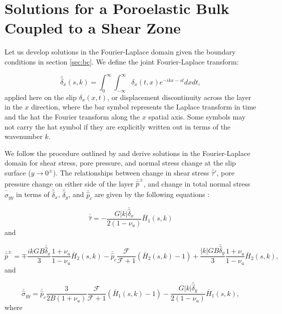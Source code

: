 \documentclass[draft]{agujournal2019}
\begin{document}
\section{Solutions for a Poroelastic Bulk Coupled to a Shear Zone} \label{sec:porosol}


Let us develop solutions in the Fourier-Laplace domain given the boundary conditions in section \ref{sec:bc}. We define the joint Fourier-Laplace transform: 

\begin{equation}
\bar{\hat{\delta}}_x(s,k) = \int_{0}^{\infty} \int_{-\infty}^{\infty} \delta_x(t,x)
e^{-ikx-st} dx dt ,
\label{eq:LF}
\end{equation}
applied here on the slip $\delta_x(x,t)$, or displacement discontinuity across the layer in the $x$ direction, where the bar symbol represents the Laplace transform in time and the hat the Fourier transform along the $x$ spatial axis. Some symbols may not carry the hat symbol if they are explicitly written out in terms of the wavenumber $k$.
	
We follow the procedure outlined by  and derive solutions in the Fourier-Laplace domain for shear stress, pore pressure, and normal stress change at the slip surface ($y \rightarrow 0^\pm$). The relationships between change in shear stress $\bar{\hat{\tau}}'$, pore pressure change on either side of the layer $\bar{\hat{p}}^\pm$, and change in total normal stress $\bar{\hat{\sigma}}_{yy}$ in terms of $\bar{\hat{\delta}}_x$, $\bar{\hat{\delta}}_y$, and $\bar{\hat{p}}_c$ are given by the following equations \cite{Heimisson2021}:
	
\begin{equation}
\bar{\hat{\tau}} = -  \frac{G |k| \bar{\hat{\delta}}_x}{2(1-\nu_u)} \bar{H}_1(s,k)
\label{eq:tau}
\end{equation}
and

\begin{equation}
\bar{\hat{p}}^\pm = \mp \frac{ik G B \bar{\hat{\delta}}_x}{3} \frac{1+\nu_u}{1-\nu_u} \bar{H}_2(s,k) -  \bar{\hat{p}}_c \frac{\mathcal{F}}{\mathcal{F} + 1} \left( \bar{H}_2(s,k) - 1 \right) + \frac{|k| G B \bar{\hat{\delta}}_y}{3} \frac{1+\nu_u}{1-\nu_u} \bar{H}_2(s,k) ,
\label{eq:p}
\end{equation}
and

\begin{equation}
\bar{\hat{\sigma}}_{yy} = \bar{\hat{p}}_c \frac{3 }{2 B (1 + \nu_u)} \frac{ \mathcal{F} }{\mathcal{F} + 1} (\bar{H}_1(s,k) - 1) - \frac{G |k| \bar{\hat{\delta}}_y}{2(1-\nu_u)} \bar{H}_1(s,k),
\label{eq:sigyy}
\end{equation}
where
\end{document}

